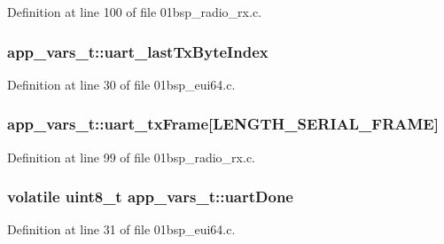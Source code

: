 Definition at line 100 of file 01bsp\+\_\+radio\+\_\+rx.\+c.

\subsubsection[{\texorpdfstring{uart\+\_\+last\+Tx\+Byte\+Index}{uart_lastTxByteIndex}}]{ app\+\_\+vars\+\_\+t\+::uart\+\_\+last\+Tx\+Byte\+Index}\hypertarget{structapp__vars__t_a7dde50f28e9c80df28276a328a0ae7fb}{}\label{structapp__vars__t_a7dde50f28e9c80df28276a328a0ae7fb}


Definition at line 30 of file 01bsp\+\_\+eui64.\+c.

\subsubsection[{\texorpdfstring{uart\+\_\+tx\+Frame}{uart_txFrame}}]{ app\+\_\+vars\+\_\+t\+::uart\+\_\+tx\+Frame\mbox{[}{\bf L\+E\+N\+G\+T\+H\+\_\+\+S\+E\+R\+I\+A\+L\+\_\+\+F\+R\+A\+ME}\mbox{]}}\hypertarget{structapp__vars__t_a8f1c35d04eaa891d5a6a91ca5ed022ab}{}\label{structapp__vars__t_a8f1c35d04eaa891d5a6a91ca5ed022ab}


Definition at line 99 of file 01bsp\+\_\+radio\+\_\+rx.\+c.

\subsubsection[{\texorpdfstring{uart\+Done}{uartDone}}]{\setlength{\rightskip}{0pt plus 5cm}volatile {\bf uint8\+\_\+t} app\+\_\+vars\+\_\+t\+::uart\+Done}\hypertarget{structapp__vars__t_a5b5b4d44bc83bb4886ec04334c9d63dc}{}\label{structapp__vars__t_a5b5b4d44bc83bb4886ec04334c9d63dc}


Definition at line 31 of file 01bsp\+\_\+eui64.\+c.

